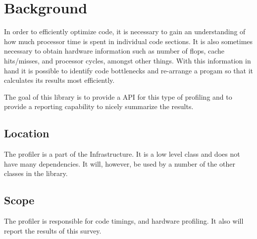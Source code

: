 
\section{Background}

In order to efficiently optimize code, it is necessary to gain an understanding
of how much processor time is spent in individual code sections.  It is also
sometimes necessary to obtain hardware information such as number of flops,
cache hits/misses, and processor cycles, amongst other things.  With this
information in hand it is possible to identify code bottlenecks and re-arrange
a progam so that it calculates its results most efficiently.

The goal of this library is to provide a API for this type of profiling 
and to provide a reporting capability to nicely summarize the
results.

\subsection{Location}

The profiler is a part of the Infrastructure.  It is a low level class and does not have many
dependencies.  It will, however, be used by a number of the other classes in the library.

\subsection{Scope}

The profiler is responsible for code timings, and hardware profiling.  It also will report
the results of this survey.


